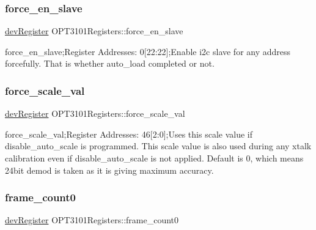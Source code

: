 \subsubsection{\texorpdfstring{force\+\_\+en\+\_\+slave}{force\_en\_slave}}
{\footnotesize\ttfamily \mbox{\hyperlink{classdev_register}{dev\+Register}} O\+P\+T3101\+Registers\+::force\+\_\+en\+\_\+slave}



force\+\_\+en\+\_\+slave;Register Addresses\+: 0\mbox{[}22\+:22\mbox{]};Enable i2c slave for any address forcefully. That is whether auto\+\_\+load completed or not. 

\mbox{\label{class_o_p_t3101_registers_a49bdd79b315c164e81ccd5f0545e76ac}} 
\subsubsection{\texorpdfstring{force\+\_\+scale\+\_\+val}{force\_scale\_val}}
{\footnotesize\ttfamily \mbox{\hyperlink{classdev_register}{dev\+Register}} O\+P\+T3101\+Registers\+::force\+\_\+scale\+\_\+val}



force\+\_\+scale\+\_\+val;Register Addresses\+: 46\mbox{[}2\+:0\mbox{]};Uses this scale value if disable\+\_\+auto\+\_\+scale is programmed. This scale value is also used during any xtalk calibration even if disable\+\_\+auto\+\_\+scale is not applied. Default is \textquotesingle{}0\textquotesingle{}, which means 24bit demod is taken as it is giving maximum accuracy. 

\mbox{\label{class_o_p_t3101_registers_a2eb6ec41e5d3e44a76e490d42198409b}} 
\subsubsection{\texorpdfstring{frame\+\_\+count0}{frame\_count0}}
{\footnotesize\ttfamily \mbox{\hyperlink{classdev_register}{dev\+Register}} O\+P\+T3101\+Registers\+::frame\+\_\+count0}



